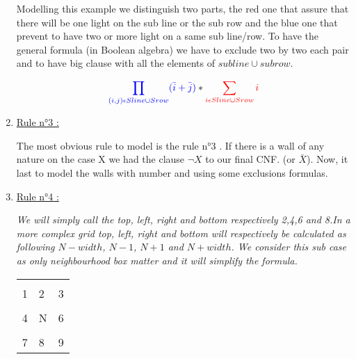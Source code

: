 \documentclass[a4paper]{article}
\begin{document}
\begin{enumerate}
Modelling this example we distinguish two parts, the red one that assure that there will be one light on the sub line or the sub row and the blue one that prevent to have two or more light on a same sub line/row. To have the general formula (in Boolean algebra) we have to exclude two by two each pair and to have big clause with all the elements of $ sub line \cup sub row $. 

$$ \textcolor{blue}{\prod_{ (i,j) \epsilon Sline \cup Srow} ( \bar{i} + \bar{j} )} * \textcolor{red}{\sum_{i \epsilon Sline \cup Srow} i}$$

	\item \underline{Rule n°3 :}
	\medskip
	\newline


 The most obvious rule to model is the rule n°3 . If there is a wall of any nature on the case X we had the clause $\neg X$ to our final CNF. (or $\bar{X}$). \newline
Now, it last to model the walls with number and using some exclusions formulas.

	\item \underline{Rule n°4 :}
	\medskip
	\newline


\textit{We will simply call the top, left, right and bottom respectively 2,4,6 and 8.In a more complex grid top, left, right and bottom will respectively be calculated as following $N-width$, $N-1$, $N+1$ and $N+width$.  We consider this sub case as only neighbourhood box matter and it will simplify the formula. }

\begin{center}
	\begin{tabular}{|m{}|m{}|m{}|}
        \hline
            &   &      \\[1ex]
          1 & 2 & 3  \\[2ex]
        \hline
            & \cellcolor[gray]{0.5}   &   \\[1ex]
          4 & \cellcolor[gray]{0.5} N & 6 \\[2ex]
        \hline
            &   &   \\[1ex]
          7 & 8 & 9 \\[2ex]
        \hline
      \end{tabular}
\end{center}


\end{enumerate}
\end{document}
